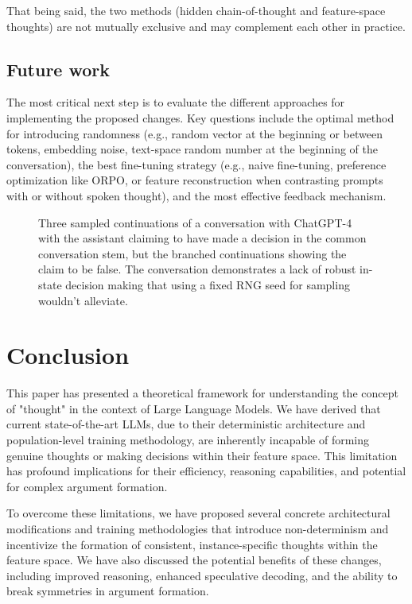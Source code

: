 \documentclass{article}
\begin{document}
That being said, the two methods (hidden chain-of-thought and feature-space thoughts) are not mutually exclusive and may complement each other in practice.

\subsection{Future work}
The most critical next step is to evaluate the different approaches for implementing the proposed changes. Key questions include the optimal method for introducing randomness (e.g., random vector at the beginning or between tokens, embedding noise, text-space random number at the beginning of the conversation), the best fine-tuning strategy (e.g., naive fine-tuning, preference optimization like ORPO, or feature reconstruction when contrasting prompts with or without spoken thought), and the most effective feedback mechanism.

\begin{figure}
  
  \caption{Three sampled continuations of a conversation with ChatGPT-4 with the assistant claiming to have made a decision in the common conversation stem, but the branched continuations showing the claim to be false. The conversation demonstrates a lack of robust in-state decision making that using a fixed RNG seed for sampling wouldn't alleviate.}
  \label{fig:20q}
\end{figure}

\section{Conclusion}
This paper has presented a theoretical framework for understanding the concept of "thought" in the context of Large Language Models. We have derived that current state-of-the-art LLMs, due to their deterministic architecture and population-level training methodology, are inherently incapable of forming genuine thoughts or making decisions within their feature space. This limitation has profound implications for their efficiency, reasoning capabilities, and potential for complex argument formation.

To overcome these limitations, we have proposed several concrete architectural modifications and training methodologies that introduce non-determinism and incentivize the formation of consistent, instance-specific thoughts within the feature space. We have also discussed the potential benefits of these changes, including improved reasoning, enhanced speculative decoding, and the ability to break symmetries in argument formation.
\end{document}
